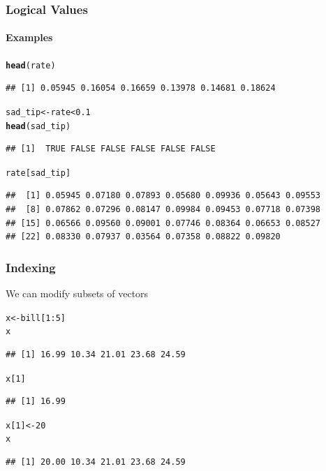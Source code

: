 \documentclass{beamer}\usepackage[]{graphicx}\usepackage[]{color}
\makeatletter
\newcommand{\hlnum}[1]{\textcolor[rgb]{0.686,0.059,0.569}{#1}}%
\newcommand{\hlopt}[1]{\textcolor[rgb]{0,0,0}{#1}}%
\newcommand{\hlstd}[1]{\textcolor[rgb]{0.345,0.345,0.345}{#1}}%
\newcommand{\hlkwb}[1]{\textcolor[rgb]{0.69,0.353,0.396}{#1}}%
\newcommand{\hlkwd}[1]{\textcolor[rgb]{0.737,0.353,0.396}{\textbf{#1}}}%
\newenvironment{kframe}{%
 \def\at@end@of@kframe{}%
 \ifinner\ifhmode%
  \def\at@end@of@kframe{\end{minipage}}%
  \begin{minipage}{\columnwidth}%
 \fi\fi%
 \def\FrameCommand##1{\hskip\@totalleftmargin \hskip-\fboxsep
 \colorbox{shadecolor}{##1}\hskip-\fboxsep
     \hskip-\linewidth \hskip-\@totalleftmargin \hskip\columnwidth}%
 \MakeFramed {\advance\hsize-\width
   \@totalleftmargin\z@ \linewidth\hsize
   \@setminipage}}%
 {\par\unskip\endMakeFramed%
 \at@end@of@kframe}
\newenvironment{knitrout}{}{} %
\makeatother
\begin{document}
\begin{frame}[fragile]
    \frametitle{Logical Values}
    \framesubtitle{Examples}
\begin{knitrout}\footnotesize
{}\color{fgcolor}\begin{kframe}
\begin{alltt}
\hlkwd{head}\hlstd{(rate)}
\end{alltt}
\begin{verbatim}
## [1] 0.05945 0.16054 0.16659 0.13978 0.14681 0.18624
\end{verbatim}
\begin{alltt}
\hlstd{sad_tip} \hlkwb{<-} \hlstd{rate} \hlopt{<} \hlnum{0.1}
\hlkwd{head}\hlstd{(sad_tip)}
\end{alltt}
\begin{verbatim}
## [1]  TRUE FALSE FALSE FALSE FALSE FALSE
\end{verbatim}
\begin{alltt}
\hlstd{rate[sad_tip]}
\end{alltt}
\begin{verbatim}
##  [1] 0.05945 0.07180 0.07893 0.05680 0.09936 0.05643 0.09553
##  [8] 0.07862 0.07296 0.08147 0.09984 0.09453 0.07718 0.07398
## [15] 0.06566 0.09560 0.09001 0.07746 0.08364 0.06653 0.08527
## [22] 0.08330 0.07937 0.03564 0.07358 0.08822 0.09820
\end{verbatim}
\end{kframe}
\end{knitrout}

\end{frame}


\begin{frame}[fragile]
    \frametitle{Indexing}
We can modify subsets of vectors
\begin{knitrout}\footnotesize
{}\color{fgcolor}\begin{kframe}
\begin{alltt}
\hlstd{x} \hlkwb{<-} \hlstd{bill[}\hlnum{1}\hlopt{:}\hlnum{5}\hlstd{]}
\hlstd{x}
\end{alltt}
\begin{verbatim}
## [1] 16.99 10.34 21.01 23.68 24.59
\end{verbatim}
\begin{alltt}
\hlstd{x[}\hlnum{1}\hlstd{]}
\end{alltt}
\begin{verbatim}
## [1] 16.99
\end{verbatim}
\begin{alltt}
\hlstd{x[}\hlnum{1}\hlstd{]} \hlkwb{<-} \hlnum{20}
\hlstd{x}
\end{alltt}
\begin{verbatim}
## [1] 20.00 10.34 21.01 23.68 24.59
\end{verbatim}
\end{kframe}
\end{knitrout}

\end{frame}
\end{document}
